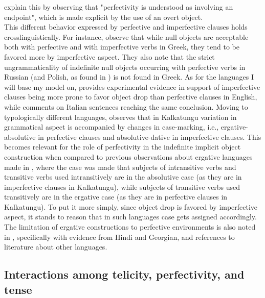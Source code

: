 \textcite[1609]{TsimpliPapadopoulou2006} explain this by observing that "perfectivity is understood as involving an endpoint", which is made explicit by the use of an overt object.\\
This different behavior expressed by perfective and imperfective clauses holds crosslinguistically. For instance, \textcite[1597]{TsimpliPapadopoulou2006} observe that while null objects are acceptable both with perfective and with imperfective verbs in Greek, they tend to be favored more by imperfective aspect. They also note \parencite[1601]{TsimpliPapadopoulou2006} that the strict ungrammaticality of indefinite null objects occurring with perfective verbs in Russian (and Polish, as found in \textcite[89]{sopata2016null}) is not found in Greek. As for the languages I will base my model on, \textcite{Medina2007} provides experimental evidence in support of imperfective clauses being more prone to favor object drop than perfective clauses in English, while \textcite{Cennamo2017} comments on Italian sentences reaching the same conclusion. Moving to typologically different languages, \textcite[118]{Naess2007} observes that in Kalkatungu variation in grammatical aspect is accompanied by changes in case-marking, i.e., ergative-absolutive in perfective clauses and absolutive-dative in imperfective clauses. This becomes relevant for the role of perfectivity in the indefinite implicit object construction when compared to previous observations about ergative languages made in , where the case was made that subjects of intransitive verbs and transitive verbs used intransitively are in the absolutive case (as they are in imperfective clauses in Kalkatungu), while subjects of transitive verbs used transitively are in the ergative case (as they are in perfective clauses in Kalkatungu). To put it more simply, since object drop is favored by imperfective aspect, it stands to reason that in such languages case gets assigned accordingly. The limitation of ergative constructions to perfective environments is also noted in \textcite[271]{HopperThompson1980}, specifically with evidence from Hindi and Georgian, and references to literature about other languages.

\subsection{Interactions among telicity, perfectivity, and tense} 


